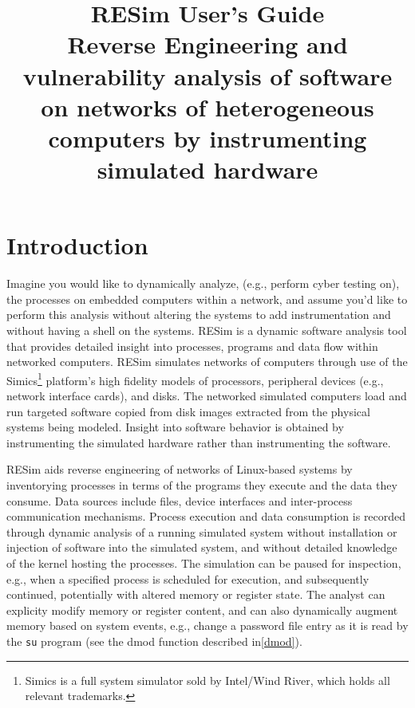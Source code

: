 \documentclass[titlepage]{article}
\begin{document}
\title {%
  RESim User's Guide \\
  \large Reverse Engineering and vulnerability analysis of software on networks of heterogeneous computers
   by instrumenting simulated hardware}
\maketitle
\tableofcontents
\newpage

\section{Introduction}
Imagine you would like to dynamically analyze, (e.g., perform cyber testing on), the processes on embedded computers within a network, and assume 
you'd like to perform this analysis without altering the systems to add instrumentation and without having a shell on the systems.
RESim is a dynamic software analysis tool that provides detailed insight into processes, programs and data flow within networked computers.  RESim simulates networks of computers through use of the Simics\footnote{ Simics is a full system simulator sold by Intel/Wind River, which holds all relevant trademarks.} 
platform's high fidelity models of processors, peripheral devices (e.g., network interface cards), and disks.  The networked simulated computers load and run targeted software copied from disk images extracted from the physical systems being modeled.  Insight into software behavior is obtained by instrumenting the simulated hardware
rather than instrumenting the software.

RESim aids reverse engineering of networks of Linux-based systems by inventorying processes in terms of the programs they execute and the data they consume.  Data sources include files, device interfaces and inter-process communication mechanisms.   Process execution and data consumption is recorded through dynamic analysis of a running simulated system without installation or injection of software into the simulated system, and without detailed knowledge of the kernel hosting the processes.
The simulation can be paused for inspection, e.g., when a specified process is scheduled for execution, and subsequently continued, potentially with altered memory or register state.  The analyst can explicity modify memory or register content, and can also dynamically augment memory 
based on system events, e.g., change a password file entry as it is read by the {\tt su} program (see the dmod function described in\ref{dmod}).
\end{document}
